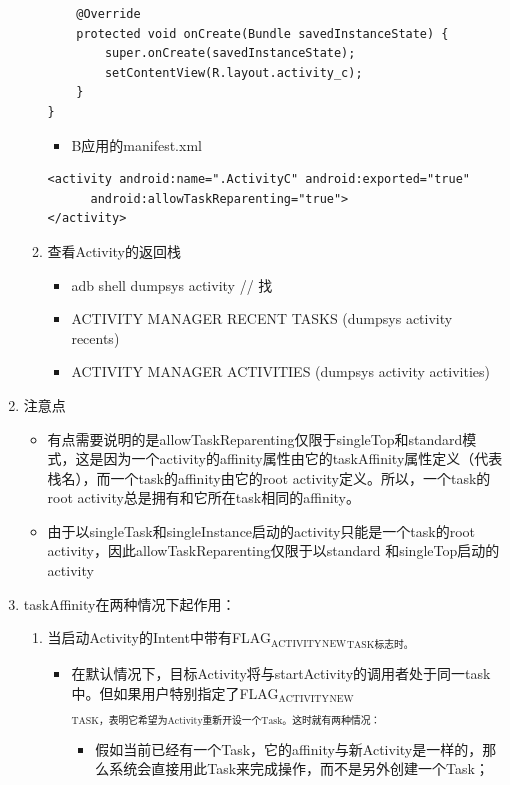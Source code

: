 \documentclass[9pt, b5paaper]{book}
\begin{document}
\begin{enumerate}
\begin{enumerate}
\begin{verbatim}
    @Override
    protected void onCreate(Bundle savedInstanceState) {
        super.onCreate(savedInstanceState);
        setContentView(R.layout.activity_c);
    }
}
\end{verbatim}
\begin{itemize}
\item B应用的manifest.xml
\end{itemize}
\begin{verbatim}
<activity android:name=".ActivityC" android:exported="true"    
      android:allowTaskReparenting="true">
</activity>
\end{verbatim}
\item 查看Activity的返回栈
\label{sec-4-9-2-1-2}
\begin{itemize}
\item adb shell dumpsys activity // 找
\item ACTIVITY MANAGER RECENT TASKS (dumpsys activity recents)
\item ACTIVITY MANAGER ACTIVITIES (dumpsys activity activities)
\end{itemize}
\end{enumerate}
\item 注意点
\label{sec-4-9-2-2}
\begin{itemize}
\item 有点需要说明的是allowTaskReparenting仅限于singleTop和standard模式，这是因为一个activity的affinity属性由它的taskAffinity属性定义（代表栈名），而一个task的affinity由它的root activity定义。所以，一个task的root activity总是拥有和它所在task相同的affinity。
\item 由于以singleTask和singleInstance启动的activity只能是一个task的root activity，因此allowTaskReparenting仅限于以standard 和singleTop启动的activity
\end{itemize}
\item taskAffinity在两种情况下起作用：
\label{sec-4-9-2-3}
\begin{enumerate}
\item 当启动Activity的Intent中带有FLAG$_{\text{ACTIVITY}}$$_{\text{NEW}}$$_{\text{TASK标志时。}}$
\label{sec-4-9-2-3-1}
\begin{itemize}
\item 在默认情况下，目标Activity将与startActivity的调用者处于同一task中。但如果用户特别指定了FLAG$_{\text{ACTIVITY}}$$_{\text{NEW}}$$_{\text{TASK，表明它希望为Activity重新开设一个Task。这时就有两种情况：}}$
\begin{itemize}
\item 假如当前已经有一个Task，它的affinity与新Activity是一样的，那么系统会直接用此Task来完成操作，而不是另外创建一个Task；

\end{itemize}
\end{itemize}
\end{enumerate}
\end{enumerate}
\end{document}
